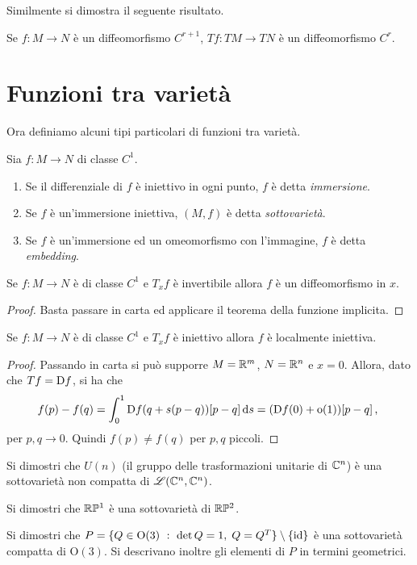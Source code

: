 Similmente si dimostra il seguente risultato.

\begin{proposition}
	Se $f:M\to N$ è un diffeomorfismo $C^{r+1}$, $Tf:TM\to TN$ è un diffeomorfismo $C^r$.
\end{proposition}

\section{Funzioni tra varietà}
Ora definiamo alcuni tipi particolari di funzioni tra varietà.
 
\begin{definition}
	Sia $f:M\to N$ di classe $C^1$.
	\begin{enumerate}
	\item Se il differenziale di $f$ è iniettivo in ogni punto, $f$ è detta \emph{immersione}. 
	\item Se $f$ è un'immersione iniettiva, $(M,f)$ è detta \emph{sottovarietà}. 
	\item Se $f$ è un'immersione ed un omeomorfismo con l'immagine, $f$ è detta \emph{embedding}. 
	\end{enumerate}
\end{definition}

\begin{proposition}
	Se $f:M\to N$ è di classe $C^1$ e $T_xf$ è invertibile allora $f$ è un diffeomorfismo in $x$.
\end{proposition}

 \begin{proof}
  Basta passare in carta ed applicare il teorema della funzione implicita.
 \end{proof}

\begin{proposition}
	Se $f:M\to N$ è di classe $C^1$ e $T_xf$ è iniettivo allora $f$ è localmente iniettiva.
\end{proposition}

\begin{proof}
	Passando in carta si può supporre $M=\mathbb R^m$, $N=\mathbb R^n$ e $x=0$. Allora, dato che $Tf=\mathrm D f$, si ha che
	\begin{equation*}
	f(p)-f(q)=\int_0^1\mathrm D f(q+s(p-q))[p-q]\,\mathrm d s=(\mathrm D f(0)+\mathrm{o}(1))[p-q]\, \text{, }
	\end{equation*}
	per $p,q\to 0$. Quindi $f(p)\ne f(q)$ per $p,q$ piccoli.
\end{proof}

\begin{exercise}
	Si dimostri che $U(n)$ (il gruppo delle trasformazioni unitarie di $\mathbb C^n$) è una sottovarietà non compatta di $\mathscr L(\mathbb C^n,\mathbb C^n)$.
\end{exercise}
\begin{exercise}
	Si dimostri che $\mathbb R \mathbb P^1$ è una sottovarietà di $\mathbb R \mathbb P^2$.
\end{exercise}
\begin{exercise}
	Si dimostri che $P=\{ Q\in \mathrm O(3)\ :\ \det Q=1,\; Q=Q^T\}\setminus\{\id\}$ è una sottovarietà compatta di $\mathrm O(3)$. Si descrivano inoltre gli elementi di $P$ in termini geometrici.
\end{exercise}